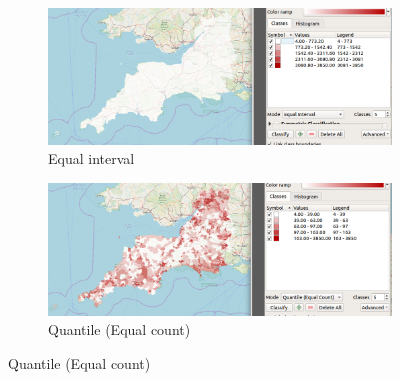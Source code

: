 \begin{figure}[h!] %
	\begin{subfigure}{0.48\textwidth}
		\includegraphics[width=\linewidth]{images/mode_equal_interval.png}
		\caption{Equal interval} \label{Equal interval}
	\end{subfigure}\hspace*{\fill}
	\begin{subfigure}{0.48\textwidth}
		\includegraphics[width=\linewidth]{images/mode_quantile.png}
		\caption{Quantile (Equal count)} \label{Quantile (Equal count)}
	\end{subfigure}
	

\end{figure}
